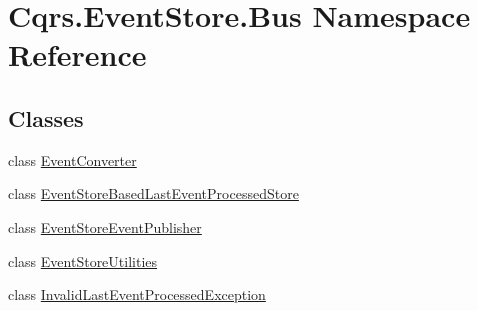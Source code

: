 \hypertarget{namespaceCqrs_1_1EventStore_1_1Bus}{}\section{Cqrs.\+Event\+Store.\+Bus Namespace Reference}
\label{namespaceCqrs_1_1EventStore_1_1Bus}
\subsection*{Classes}
\begin{DoxyCompactItemize}
\item 
class \hyperlink{classCqrs_1_1EventStore_1_1Bus_1_1EventConverter}{Event\+Converter}
\item 
class \hyperlink{classCqrs_1_1EventStore_1_1Bus_1_1EventStoreBasedLastEventProcessedStore}{Event\+Store\+Based\+Last\+Event\+Processed\+Store}
\item 
class \hyperlink{classCqrs_1_1EventStore_1_1Bus_1_1EventStoreEventPublisher}{Event\+Store\+Event\+Publisher}
\item 
class \hyperlink{classCqrs_1_1EventStore_1_1Bus_1_1EventStoreUtilities}{Event\+Store\+Utilities}
\item 
class \hyperlink{classCqrs_1_1EventStore_1_1Bus_1_1InvalidLastEventProcessedException}{Invalid\+Last\+Event\+Processed\+Exception}
\end{DoxyCompactItemize}

